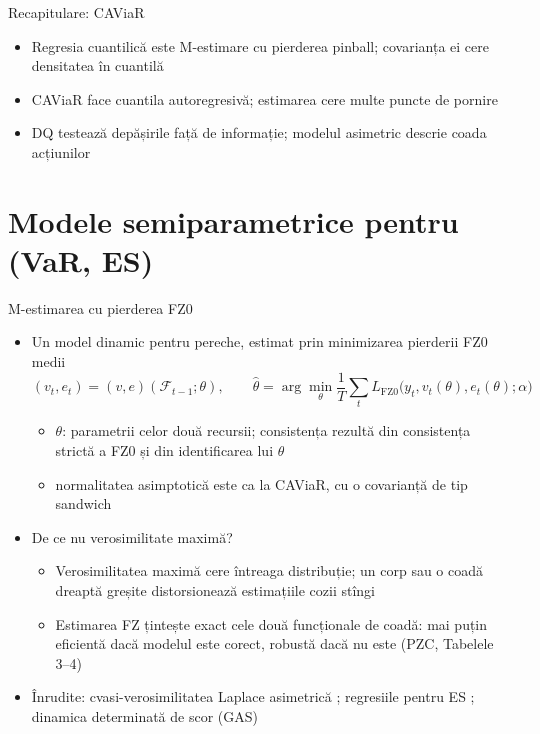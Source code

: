 \begin{frame}{Recapitulare: CAViaR}
\itemsize{\small}
\begin{itemize}
    \item Regresia cuantilică este M-estimare cu pierderea pinball; covarianța ei cere densitatea în cuantilă
    \item CAViaR face cuantila autoregresivă; estimarea cere multe puncte de pornire
    \item DQ testează depășirile față de informație; modelul asimetric descrie coada acțiunilor
\end{itemize}
\end{frame}


\section{Modele semiparametrice pentru (VaR, ES)}

\begin{frame}{M-estimarea cu pierderea FZ0}
\itemsize{\small}
\begin{itemize}
    \item Un model dinamic pentru pereche, estimat prin minimizarea pierderii FZ0 medii 
    \[ (v_t, e_t) = (v, e)(\mathcal F_{t-1}; \theta), \qquad \hat\theta = \arg\min_\theta \frac1T\sum_t L_{\mathrm{FZ0}}\big(y_t, v_t(\theta), e_t(\theta); \alpha\big) \]
    \begin{itemize}
        \item $\theta$: parametrii celor două recursii; consistența rezultă din consistența strictă a FZ0 și din identificarea lui $\theta$
        \item normalitatea asimptotică este ca la CAViaR, cu o covarianță de tip sandwich
    \end{itemize}
    \item De ce nu verosimilitate maximă?
    \begin{itemize}
        \item Verosimilitatea maximă cere întreaga distribuție; un corp sau o coadă dreaptă greșite distorsionează estimațiile cozii stîngi
        \item Estimarea FZ țintește exact cele două funcționale de coadă: mai puțin eficientă dacă modelul este corect, robustă dacă nu este (PZC, Tabelele 3--4)
    \end{itemize}
    \item Înrudite: cvasi-verosimilitatea Laplace asimetrică ; regresiile pentru ES ; dinamica determinată de scor (GAS) 
\end{itemize}
\end{frame}

